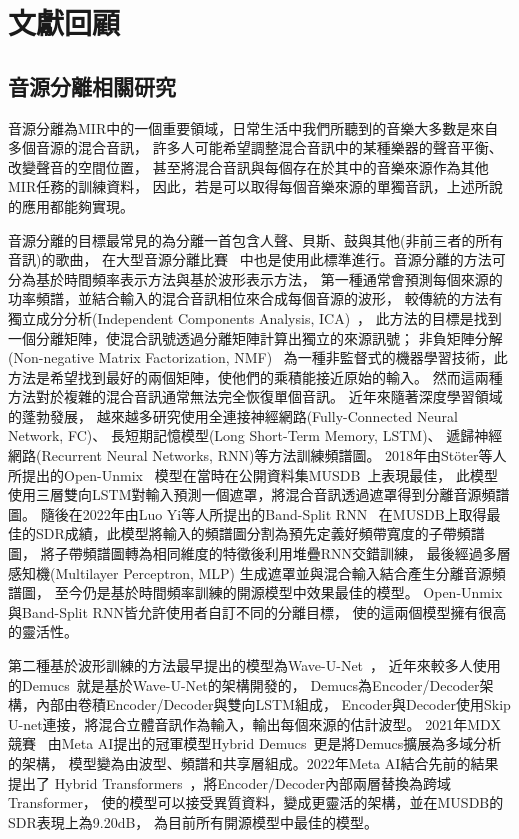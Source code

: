 \documentclass[class=NCU_thesis, crop=false]{standalone}
\begin{document}
\pagebreak

\section{文獻回顧}
\subsection{音源分離相關研究}
音源分離為MIR中的一個重要領域，日常生活中我們所聽到的音樂大多數是來自多個音源的混合音訊，
許多人可能希望調整混合音訊中的某種樂器的聲音平衡、改變聲音的空間位置，
甚至將混合音訊與每個存在於其中的音樂來源作為其他MIR任務的訓練資料，
因此，若是可以取得每個音樂來源的單獨音訊，上述所說的應用都能夠實現。

音源分離的目標最常見的為分離一首包含人聲、貝斯、鼓與其他(非前三者的所有音訊)的歌曲，
在大型音源分離比賽~\cite{Yuki_Mitsufuji2021MusicDemixing, Fabbro_Giorgio2023TheSoundDemixing}
中也是使用此標準進行。音源分離的方法可分為基於時間頻率表示方法與基於波形表示方法，
第一種通常會預測每個來源的功率頻譜，並結合輸入的混合音訊相位來合成每個音源的波形，
較傳統的方法有獨立成分分析(Independent Components Analysis, ICA)~\cite{comon1994independent}，
此方法的目標是找到一個分離矩陣，使混合訊號透過分離矩陣計算出獨立的來源訊號；
非負矩陣分解(Non-negative Matrix Factorization, NMF)~\cite{lee2000algorithms}
為一種非監督式的機器學習技術，此方法是希望找到最好的兩個矩陣，使他們的乘積能接近原始的輸入。
然而這兩種方法對於複雜的混合音訊通常無法完全恢復單個音訊。
近年來隨著深度學習領域的蓬勃發展，
越來越多研究使用全連接神經網路(Fully-Connected Neural Network, FC)、
長短期記憶模型(Long Short-Term Memory, LSTM)、
遞歸神經網路(Recurrent Neural Networks, RNN)等方法訓練頻譜圖。
2018年由Stöter等人所提出的Open-Unmix~\cite{FabianRobert_Stöter2019OpenUnmix}
模型在當時在公開資料集MUSDB~\cite{Rafii2017musdb18}上表現最佳，
此模型使用三層雙向LSTM對輸入預測一個遮罩，將混合音訊透過遮罩得到分離音源頻譜圖。
隨後在2022年由Luo Yi等人所提出的Band-Split RNN~\cite{Luo_Yi2022MusicSourceSeparation}
在MUSDB上取得最佳的SDR成績，此模型將輸入的頻譜圖分割為預先定義好頻帶寬度的子帶頻譜圖，
將子帶頻譜圖轉為相同維度的特徵後利用堆疊RNN交錯訓練，
最後經過多層感知機(Multilayer Perceptron, MLP)
生成遮罩並與混合輸入結合產生分離音源頻譜圖，
至今仍是基於時間頻率訓練的開源模型中效果最佳的模型。
Open-Unmix與Band-Split RNN皆允許使用者自訂不同的分離目標，
使的這兩個模型擁有很高的靈活性。

第二種基於波形訓練的方法最早提出的模型為Wave-U-Net~\cite{stoller2018wave}，
近年來較多人使用的Demucs~\cite{défossez2021music}就是基於Wave-U-Net的架構開發的，
Demucs為Encoder/Decoder架構，內部由卷積Encoder/Decoder與雙向LSTM組成，
Encoder與Decoder使用Skip U-net連接，將混合立體音訊作為輸入，輸出每個來源的估計波型。
2021年MDX競賽~\cite{Yuki_Mitsufuji2021MusicDemixing}
由Meta AI提出的冠軍模型Hybrid Demucs~\cite{defossez2021hybrid}更是將Demucs擴展為多域分析的架構，
模型變為由波型、頻譜和共享層組成。2022年Meta AI結合先前的結果提出了
Hybrid Transformers~\cite{rouard2023hybrid}，將Encoder/Decoder內部兩層替換為跨域Transformer，
使的模型可以接受異質資料，變成更靈活的架構，並在MUSDB的SDR表現上為9.20dB，
為目前所有開源模型中最佳的模型。
\end{document}

